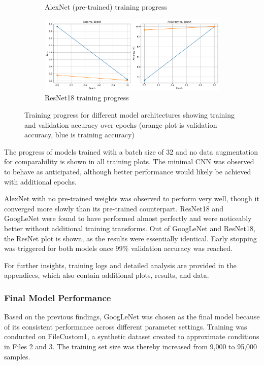 \documentclass[conference]{IEEEtran}
\begin{document}
\begin{figure}[h]
\begin{subfigure}[b]{0.45\textwidth}
      \caption{AlexNet (pre-trained) training progress}
      \label{fig:progress_alexnet}
    \end{subfigure}
    \hfill
    \begin{subfigure}[b]{0.45\textwidth}
        \centering
        \includegraphics[width=\textwidth]{images/training_progress_ResNet.png}
        \caption{ResNet18 training progress}
        \label{fig:progress_resnet}
    \end{subfigure}
    \caption{Training progress for different model architectures showing training and validation accuracy over epochs (orange plot is validation accuracy,
    blue is training accuracy)}
    \label{fig:training_progress}
\end{figure}

The progress of models trained with a batch size of 32 and no data augmentation for comparability is shown in all training plots. The
minimal CNN was observed to behave as anticipated, although better performance would likely be achieved with additional epochs. 

AlexNet with no pre-trained weights was observed to perform very well, though it converged more slowly than its pre-trained counterpart.
ResNet18 and GoogLeNet were found to have performed almost perfectly and were noticeably better without additional training transforms.
Out of GoogLeNet and ResNet18, the ResNet plot is shown, as the results were essentially identical. Early stopping was triggered for both models once 99\% 
validation accuracy was reached.

For further insights, training logs and detailed analysis are provided in the appendices, which also contain additional plots, results, and data.

\subsubsection{Final Model Performance}

Based on the previous findings, GoogLeNet was chosen as the final model because of its consistent performance across different parameter
settings. Training was conducted on FileCustom1, a synthetic dataset created to approximate conditions in Files 2 and 3. The training set
size was thereby increased from 9,000 to 95,000 samples.
\end{document}
